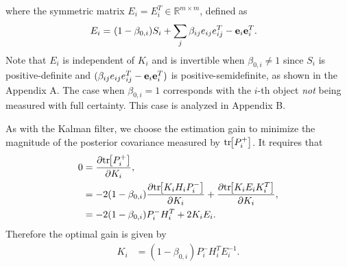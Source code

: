 \documentclass[letterpaper, 10pt, conference]{ieeeconf}
\newcommand{\bracket}[1]{\ensuremath{\left[ #1 \right]}}
\newcommand{\tr}[1]{\mathrm{tr}\ensuremath{\negthickspace\bracket{#1}}}
\renewcommand{\Re}{\ensuremath{\mathbb{R}}}
\begin{document}
where the symmetric matrix $E_i=E_i^T\in\Re^{m\times m}$, defined as
\begin{align}
E_i=&\ (1-\beta_{0,i})S_i+{\sum\limits_{j} \beta_{ij}e_{ij}e_{ij}^T-{\bf{e}}_{i}}{\bf{e}}_{i}^T.
\end{align}
Note that $E_i$ is independent of $K_i$ and is invertible when $\beta_{0,i}\neq1$ since $S_i$ is positive-definite and
$(\beta_{ij}e_{ij}e_{ij}^T-{\bf{e}}_{i}{\bf{e}}_{i}^T)$ is positive-semidefinite, as shown in the Appendix A. 
The case when $\beta_{0,i}=1$ corresponds with the $i$-th object \emph{not} being measured with full certainty.
This case is analyzed in Appendix B.

As with the Kalman filter, we choose the estimation gain to minimize the magnitude of the posterior covariance measured by $\tr{P_i^+}$.
It requires that
%
\begin{align}
0&=\frac{\partial\tr{P^+_i}}{\partial K_i},\nonumber
\\
&=-2(1-\beta_{0,i})\frac{\partial\tr{K_iH_iP^-_i}}{\partial K_i}+\frac{\partial\tr{K_iE_iK_i^T}}{\partial K_i},\nonumber
\\
&=-2(1-\beta_{0,i})P^-_iH_i^T+2K_iE_i.\label{eqn:Uncertainty0}
\end{align}
Therefore the optimal gain is given by
\begin{align}
K_i&=(1-\beta_{0,i})P^-_iH_i^TE_i^{-1}.\label{eqn:GainK}
\end{align}
\end{document}
